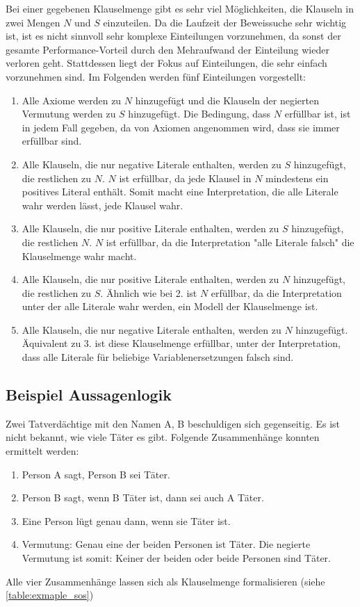 Bei einer gegebenen Klauselmenge gibt es sehr viel Möglichkeiten, die Klauseln in zwei Mengen $N$ und $S$ einzuteilen. Da die Laufzeit der Beweissuche sehr wichtig ist, ist es nicht sinnvoll sehr komplexe Einteilungen vorzunehmen, da sonst der gesamte Performance-Vorteil durch den Mehraufwand der Einteilung wieder verloren geht. Stattdessen liegt der Fokus auf Einteilungen, die sehr einfach vorzunehmen sind. Im Folgenden werden fünf Einteilungen vorgestellt:
\begin{enumerate}
	\item Alle Axiome werden zu $N$ hinzugefügt und die Klauseln der negierten Vermutung werden zu $S$ hinzugefügt. Die Bedingung, dass $N$ erfüllbar ist, ist in jedem Fall gegeben, da von Axiomen angenommen wird, dass sie immer erfüllbar sind.
	\item Alle Klauseln, die nur negative Literale enthalten, werden zu $S$ hinzugefügt, die restlichen zu $N$. $N$ ist erfüllbar, da jede Klausel in $N$ mindestens ein positives Literal enthält. Somit macht eine Interpretation, die alle Literale wahr werden lässt, jede Klausel wahr.
	\item Alle Klauseln, die nur positive Literale enthalten, werden zu $S$ hinzugefügt, die restlichen $N$. $N$ ist erfüllbar, da die Interpretation "alle Literale falsch" die Klauselmenge wahr macht.
	\item Alle Klauseln, die nur positive Literale enthalten, werden zu $N$ hinzugefügt, die restlichen zu $S$. Ähnlich wie bei 2. ist $N$ erfüllbar, da die Interpretation unter der alle Literale wahr werden, ein Modell der Klauselmenge ist.
	\item Alle Klauseln, die nur negative Literale enthalten, werden zu $N$ hinzugefügt. Äquivalent zu 3. ist diese Klauselmenge erfüllbar, unter der Interpretation, dass alle Literale für beliebige Variablenersetzungen falsch sind.
\end{enumerate}

		\subsection{Beispiel Aussagenlogik}

Zwei Tatverdächtige mit den Namen A, B beschuldigen sich gegenseitig. Es ist nicht bekannt, wie viele Täter es gibt. Folgende Zusammenhänge konnten ermittelt werden:
\begin{enumerate}
	\item Person A sagt, Person B sei Täter.
	\item Person B sagt, wenn B Täter ist, dann sei auch A Täter.
	\item Eine Person lügt genau dann, wenn sie Täter ist.
	\item Vermutung: Genau eine der beiden Personen ist Täter. Die negierte Vermutung ist somit: Keiner der beiden oder beide Personen sind Täter.
\end{enumerate}
Alle vier Zusammenhänge lassen sich als Klauselmenge formalisieren (siehe \ref{table:exmaple_sos})

